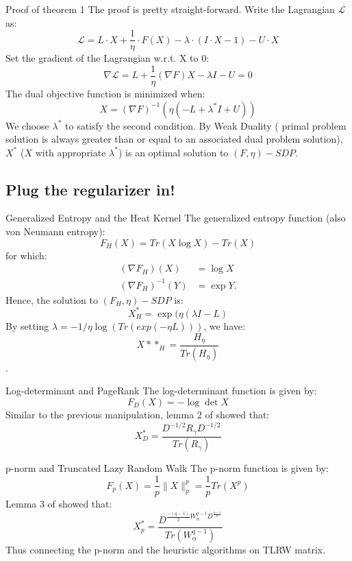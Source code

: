 \documentclass[handout]{beamer}
\begin{document}
    \begin{frame}{Proof of theorem 1}
        \pause
        The proof is pretty straight-forward. Write the Lagrangian $\mathcal{L}$ as:        $$\mathcal{L} = L \cdot X + \frac{1}{\eta} \cdot F(X) - \lambda \cdot (I \cdot X - 1) - U \cdot X$$
        \pause
        Set the gradient of the Lagrangian w.r.t. X to 0:
        $$\nabla \mathcal{L} = L + \frac{1}{\eta}(\nabla F)X-\lambda I - U = 0 $$
        \pause
        The dual objective function is minimized when:
        $$X = (\nabla F)^{-1} (\eta (-L + \lambda^\ast I + U))$$
        \pause
        We choose $\lambda^\ast$ to satisfy the second condition. By Weak Duality ( primal problem solution is always greater than or equal to an associated dual problem solution), $X^\ast$ ($X$ with appropriate $\lambda^\ast$) is an optimal solution to $(F,\eta) - SDP$.
    \end{frame}

    \subsection{Plug the regularizer in!}
    
    \begin{frame}{Generalized Entropy and the Heat Kernel}
        \pause
        The generalized entropy function (also von Neumann entropy):
        $$F_H(X) = Tr(X \log{X}) - Tr(X) $$
        \pause
        for which:
        \begin{align*}
        (\nabla F_H)(X) &= \log{X}\\            
        (\nabla F_H)^{-1}(Y) &= \exp{Y}.
        \end{align*}
        \pause
        Hence, the solution to $(F_H,\eta) - SDP$ is:
        $$X^\ast_H = \exp{(\eta (\lambda I - L)}$$
        \pause
        By setting $\lambda = -1/\eta \log{(Tr(exp(-\eta L)))}$, we have:
        $$X*\ast_H = \frac{H_\eta}{Tr(H_\eta)}$$.
    \end{frame}
    
    \begin{frame}{Log-determinant and PageRank}
        The log-determinant function is given by:
        $$F_D(X) = -\log{\det{X}}$$
        Similar to the previous manipulation, lemma 2 of \cite{mahoney2010implementing} showed that:
        $$X^\ast_D = \frac{D^{-1/2} R_\gamma D^{-1/2}}{Tr(R_\gamma)}$$
    \end{frame}

    \begin{frame}{p-norm and Truncated Lazy Random Walk}
        The p-norm function is given by:
        $$F_p(X) = \frac{1}{p} \parallel X \parallel^p_p = \frac{1}{p} Tr(X^p)$$
        Lemma 3 of \cite{mahoney2010implementing} showed that:
        $$X^\ast_p = \frac{D^{\frac{-(q-1)}{2}W_\alpha^{q-1}D^{\frac{q-1}{2}}}}{Tr(W_\alpha^{q-1})}$$
        Thus connecting the p-norm and the heuristic algorithms on TLRW matrix.
    \end{frame}
    
\end{document}

